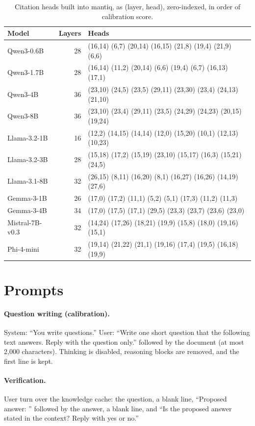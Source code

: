 \documentclass[11pt]{article}
\begin{document}
\begin{table}[h]
\centering
\small
\caption{Citation heads built into mantiq, as (layer, head), zero-indexed, in order of calibration score.}
\begin{tabular}{lrl}
\toprule
Model & Layers & Heads \\
\midrule
Qwen3-0.6B & 28 & (16,14) (6,7) (20,14) (16,15) (21,8) (19,4) (21,9) (6,6) \\
Qwen3-1.7B & 28 & (16,14) (11,2) (20,14) (6,6) (19,4) (6,7) (16,13) (17,1) \\
Qwen3-4B & 36 & (23,10) (24,5) (23,5) (29,11) (23,30) (23,4) (24,13) (21,10) \\
Qwen3-8B & 36 & (23,10) (23,4) (29,11) (23,5) (24,29) (24,23) (20,15) (19,24) \\
Llama-3.2-1B & 16 & (12,2) (14,15) (14,14) (12,0) (15,20) (10,1) (12,13) (10,23) \\
Llama-3.2-3B & 28 & (15,18) (17,2) (15,19) (23,10) (15,17) (16,3) (15,21) (24,5) \\
Llama-3.1-8B & 32 & (26,15) (8,11) (16,20) (8,1) (16,27) (16,26) (14,19) (27,6) \\
Gemma-3-1B & 26 & (17,0) (17,2) (11,1) (5,2) (5,1) (17,3) (11,2) (11,3) \\
Gemma-3-4B & 34 & (17,0) (17,5) (17,1) (29,5) (23,3) (23,7) (23,6) (23,0) \\
Mistral-7B-v0.3 & 32 & (14,24) (17,26) (18,21) (19,9) (15,8) (18,0) (19,16) (15,1) \\
Phi-4-mini & 32 & (19,14) (21,22) (21,1) (19,16) (17,4) (19,5) (16,18) (19,9) \\
\bottomrule
\end{tabular}
\end{table}

\section{Prompts}
\label{app:prompts}

\paragraph{Question writing (calibration).} System: ``You write questions.'' User: ``Write one short question that the following text answers. Reply with the question only.'' followed by the document (at most 2{,}000 characters). Thinking is disabled, reasoning blocks are removed, and the first line is kept.

\paragraph{Verification.} User turn over the knowledge cache: the question, a blank line, ``Proposed answer: '' followed by the answer, a blank line, and ``Is the proposed answer stated in the context? Reply with yes or no.''
\end{document}
